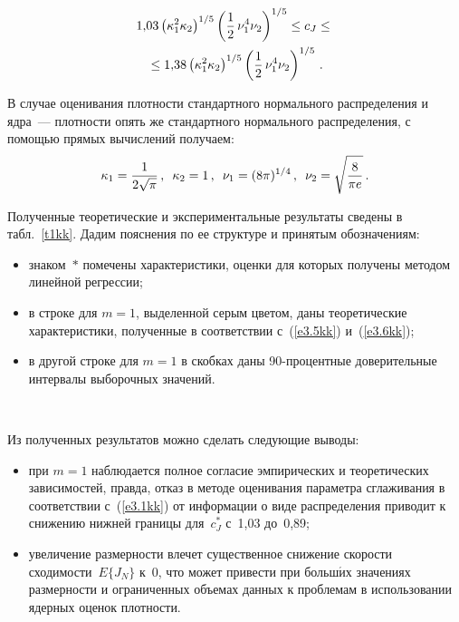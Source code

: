 \begin{multicols}{2}
\noindent
\begin{multline*}
1{,}03\left(\kappa_1^2\kappa_2\right)^{1/5}\left(\displaystyle\frac{\displaystyle 1\mathstrut}{\displaystyle 2\mathstrut}\,\nu_1^4\nu_2\right)^{1/5}\leq c_J\leq {}\\
{}\leq
1{,}38\left(\kappa_1^2\kappa_2\right)^{1/5}\left(\displaystyle\frac{\displaystyle 1\mathstrut}{\displaystyle 2\mathstrut}\,\nu_1^4\nu_2\right)^{1/5}\,.
\end{multline*}
            
В случае оценивания плотности стандартного нормального распределения и ядра~--- 
плотности опять же стандартного нормального распределения, с помощью прямых вычислений 
получаем:
      $$
      \kappa_1 =\displaystyle\frac{\displaystyle 1\mathstrut}{\displaystyle 2\sqrt{\pi}\mathstrut}\,,\enskip \kappa_2=1\,,\enskip \nu_1=(8\pi)^{1/4}\,,\enskip 
\nu_2=\sqrt{\displaystyle\frac{\displaystyle 8\mathstrut}{\displaystyle \pi e\mathstrut}}\,.
      $$
      
      Полученные теоретические и экспериментальные результаты сведены в табл.~\ref{t1kk}. 
Дадим пояснения по ее структуре и принятым обозначениям:
      \begin{itemize}
\item знаком~$*$ помечены характеристики, оценки для которых получены методом линейной 
регрессии;
\item в строке для $m=1$, выделенной серым цветом, даны теоретические характеристики, 
полученные в соответствии с~(\ref{e3.5kk}) и~(\ref{e3.6kk});
\item в другой строке для $m=1$ в скобках даны 90-процентные доверительные интервалы выборочных 
значений.
\end{itemize}



\begin{figure*}         %
\vspace*{1pt}
\begin{center}
\mbox{%
\epsfxsize=120mm
}
\end{center}
\vspace*{-9pt}
\end{figure*}

      Из полученных результатов можно сделать следующие выводы:
      \begin{itemize}
\item при $m=1$ наблюдается полное согласие эмпирических и теоретических зависимостей, 
правда, отказ в методе оценивания параметра сглаживания в соответствии с~(\ref{e3.1kk}) от 
информации о виде распределения приводит к снижению нижней границы для~$c_J^*$ с~1,03 
до~0,89;
\item увеличение размерности влечет существенное снижение скорости сходимости~$E\{J_N\}$ 
к~0, что может привести при больш$\acute{\mbox{и}}$х значениях размерности и ограниченных объемах данных к 
проблемам в использовании ядерных оценок плотности.
\end{itemize}


\end{multicols}

